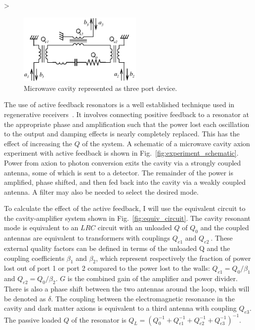 >\documentclass[aps,prl,twocolumn,groupedaddress]{revtex4-1}
\begin{document}
\begin{figure}
\includegraphics[width=6cm]{figs/amplitude_definitions.eps}
\caption{\label{fig:amplitude_defs} Microwave cavity represented as three port device.}
\end{figure}

The use of active feedback resonators is a well established technique used in regenerative receivers~\cite{armstrong1914wireless}.
It involves connecting positive feedback to a resonator at the appropriate phase and amplification such that the power lost each oscillation to the output and damping effects is nearly completely replaced.  
This has the effect of increasing the $Q$ of the system.
A schematic of a microwave cavity axion experiment with active feedback is shown in Fig.~\ref{fig:experiment_schematic}.   Power from axion to photon conversion exits the cavity via a strongly coupled antenna, some of which is sent to a detector.  The remainder of the power is amplified, phase shifted, and then fed back into the cavity via a weakly coupled antenna.  A filter may also be needed to select the desired mode. 

To calculate the effect of the active feedback, I will use the equivalent circuit to the cavity-amplifier system shown in Fig.~\ref{fig:equiv_circuit}.  The cavity resonant mode is equivalent to an $LRC$ circuit with an unloaded $Q$ of $Q_0$ and the coupled antennas are equivalent to transformers with couplings $Q_{e1}$ and $Q_{e2}~$\cite{Montgomery:1948}.  These external quality factors can be defined in terms of the unloaded Q and the coupling coefficients $\beta_1$ and $\beta_2$, which represent respectively the fraction of power lost out of port 1 or port 2 compared to the power lost to the walls: $Q_{e1} = Q_0/\beta_1$ and $Q_{e2} = Q_0/\beta_2$. $G$ is the combined gain of the amplifier and power divider.  There is also a phase shift between the two antennas around the loop, which will be denoted as $\delta$.  The coupling between the electromagnetic resonance in the cavity and dark matter axions is equivalent to a third antenna with coupling $Q_{e3}$.  The passive loaded $Q$ of the resonator is $Q_L=\left(Q_0^{-1}+Q_{e1}^{-1}+Q_{e2}^{-1}+Q_{e3}^{-1}\right)^{-1}$.
\end{document}
